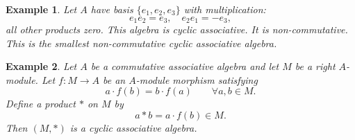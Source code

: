 \documentclass[pdflatex,sn-mathphys-num]{sn-jnl}%
\theoremstyle{thmstyleone}%
\newtheorem{example}{Example}[section]
\theoremstyle{thmstyletwo}%
\theoremstyle{thmstylethree}%
\begin{document}
\begin{example}\label{ex:a1}
 Let $A$ have basis $\{e_1, e_2,e_3\}$ with multiplication:
\[
e_1e_2 = e_3,\quad e_2e_1 = -e_3,
\]
all other products zero. This algebra is cyclic associative. It is non-commutative. This is the smallest non-commutative cyclic associative algebra.
\end{example}
\begin{example}\label{prop:construction_f}
Let $A$ be a commutative associative algebra and let $M$ be a right $A$-module. Let $f: M \to A$ be an $A$-module morphism satisfying
\[
a \cdot f(b) = b \cdot f(a) \qquad \forall a, b \in M.
\]
Define a product $\ast$ on $M$ by
\[
a \ast b = a \cdot f(b) \in M.
\]
Then $(M, \ast)$ is a cyclic associative algebra.
\end{example}

\end{document}
